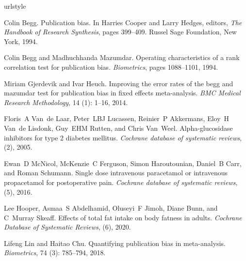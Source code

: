 \documentclass[12pt]{article}
\begin{document}
% 
% 
% 
\begin{thebibliography}{7}
  \providecommand{\natexlab}[1]{#1}
  \providecommand{\url}[1]{\texttt{#1}}
  \expandafter\ifx\csname urlstyle\endcsname\relax
  \providecommand{\doi}[1]{doi: #1}\else
  \providecommand{\doi}{doi: \begingroup \urlstyle{rm}\Url}\fi

  Colin Begg.
  \newblock Publication bias.
  \newblock In Harries Cooper and Larry Hedges, editors, \emph{The Handbook of
    Research Synthesis}, pages 399--409. Russel Sage Foundation, New York, 1994.

  Colin Begg and Madhuchhanda Mazumdar.
  \newblock Operating characteristics of a rank correlation test for publication
  bias.
  \newblock \emph{Biometrics}, pages 1088--1101, 1994.

  Miriam Gjerdevik and Ivar Heuch.
  \newblock Improving the error rates of the begg and mazumdar test for
  publication bias in fixed effects meta-analysis.
  \newblock \emph{BMC Medical Research Methodology}, 14 (1):
  1--16, 2014.

  Floris~A Van~de Laar, Peter~LBJ Lucassen, Reinier~P Akkermans, Eloy~H Van~de
  Lisdonk, Guy~EHM Rutten, and Chris Van~Weel.
  \newblock Alpha-glucosidase inhibitors for type 2 diabetes mellitus.
  \newblock \emph{Cochrane database of systematic reviews},  (2), 2005.

  Ewan~D McNicol, McKenzie~C Ferguson, Simon Haroutounian, Daniel~B Carr, and
  Roman Schumann.
  \newblock Single dose intravenous paracetamol or intravenous propacetamol for
  postoperative pain.
  \newblock \emph{Cochrane database of systematic reviews},  (5), 2016.

  Lee Hooper, Asmaa~S Abdelhamid, Oluseyi~F Jimoh, Diane Bunn, and C~Murray
  Skeaff.
  \newblock Effects of total fat intake on body fatness in adults.
  \newblock \emph{Cochrane Database of Systematic Reviews},  (6), 2020.

  Lifeng Lin and Haitao Chu.
  \newblock Quantifying publication bias in meta-analysis.
  \newblock \emph{Biometrics}, 74 (3): 785--794, 2018.

\end{thebibliography}
\end{document}

